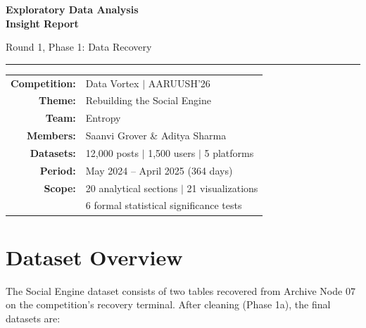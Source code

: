 \documentclass[11pt,a4paper]{article}
\begin{document}
\color{bodytext}

\begin{titlepage}
\centering
\vspace*{4cm}
{\Huge\bfseries\color{primary} Exploratory Data Analysis\\[0.3cm] Insight Report\par}
\vspace{1cm}
{\Large\color{gray} Round 1, Phase 1: Data Recovery\par}
\vspace{2cm}
{\color{accent}\rule{8cm}{1pt}\par}
\vspace{2cm}
{\large
\begin{tabular}{rl}
\textbf{Competition:} & Data Vortex $|$ AARUUSH'26 \\
\textbf{Theme:} & Rebuilding the Social Engine \\
\textbf{Team:} & Entropy \\
\textbf{Members:} & Saanvi Grover \& Aditya Sharma \\[0.5cm]
\textbf{Datasets:} & 12,000 posts $|$ 1,500 users $|$ 5 platforms \\
\textbf{Period:} & May 2024 -- April 2025 (364 days) \\
\textbf{Scope:} & 20 analytical sections $|$ 21 visualizations \\
& 6 formal statistical significance tests \\
\end{tabular}
\par}
\vfill
\end{titlepage}

\tableofcontents
\newpage

\section{Dataset Overview}

The Social Engine dataset consists of two tables recovered from Archive Node 07 on the competition's recovery terminal. After cleaning (Phase 1a), the final datasets are:
\end{document}
